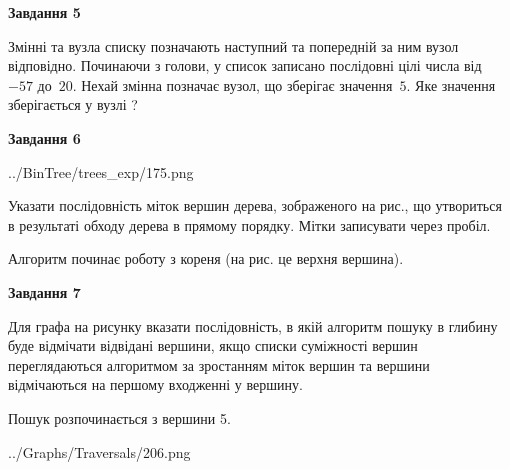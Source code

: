 \documentclass[12pt, ukrainian]{article}
\begin{document}
{\begin {large}
{\begin {center}\textbf{Завдання 5}\end {center}}\par
Змінні  та  вузла списку позначають наступний та попередній за ним вузол відповідно. Починаючи з голови, у список записано послідовні цілі числа від~$-57$ до~$20$. Нехай змінна  позначає вузол, що зберігає значення~$5$.
Яке значення зберігається у вузлі  ?\par
\newpage

{\begin {center}\textbf{Завдання 6}\end {center}}\par

\begin{center}
	{../BinTree/trees_exp/175.png}
\end{center}
Указати послідовність міток вершин дерева, зображеного на рис., що утвориться в результаті обходу дерева в прямому порядку. Мітки записувати через пробіл.\par Алгоритм починає роботу з кореня (на рис. це верхня вершина).\par
\newpage

{\begin {center}\textbf{Завдання 7}\end {center}}\par
Для графа на рисунку вказати послідовність, в якій алгоритм пошуку в глибину буде відмічати відвідані вершини, якщо списки суміжності вершин переглядаються алгоритмом за зростанням міток вершин та вершини відмічаються на першому вход\-женні у вершину.\par
Пошук розпочинається з вершини 5.\par

\begin{center}
	{../Graphs/Traversals/206.png}
\end{center}\par
\newpage


\end{large}}
\end{document}
